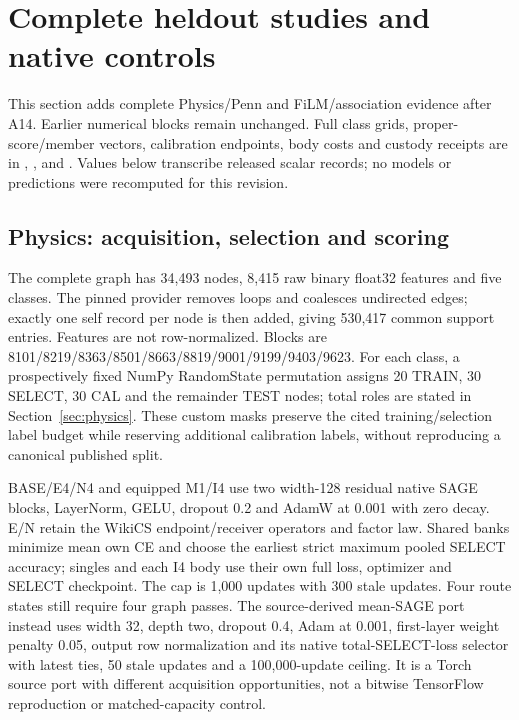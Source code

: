 \section{Complete heldout studies and native controls}\label{app:complete-confirmation-v5}
This section adds complete Physics/Penn and FiLM/association evidence after A14. Earlier numerical blocks remain unchanged. Full class grids, proper-score/member vectors, calibration endpoints, body costs and custody receipts are in , ,  and . Values below transcribe released scalar records; no models or predictions were recomputed for this revision.

\subsection{Physics: acquisition, selection and scoring}\label{app:physics-v5}
The complete graph has 34,493 nodes, 8,415 raw binary float32 features and five classes. The pinned provider removes loops and coalesces undirected edges; exactly one self record per node is then added, giving 530,417 common support entries. Features are not row-normalized. Blocks are 8101/8219/8363/8501/8663/8819/9001/9199/9403/9623. For each class, a prospectively fixed NumPy RandomState permutation assigns 20 TRAIN, 30 SELECT, 30 CAL and the remainder TEST nodes; total roles are stated in Section~\ref{sec:physics}. These custom masks preserve the cited training/selection label budget while reserving additional calibration labels, without reproducing a canonical published split.

BASE/E4/N4 and equipped M1/I4 use two width-128 residual native SAGE blocks, LayerNorm, GELU, dropout 0.2 and AdamW at 0.001 with zero decay. E/N retain the WikiCS endpoint/receiver operators and factor law. Shared banks minimize mean own CE and choose the earliest strict maximum pooled SELECT accuracy; singles and each I4 body use their own full loss, optimizer and SELECT checkpoint. The cap is 1,000 updates with 300 stale updates. Four route states still require four graph passes. The source-derived mean-SAGE port instead uses width 32, depth two, dropout 0.4, Adam at 0.001, first-layer weight penalty 0.05, output row normalization and its native total-SELECT-loss selector with latest ties, 50 stale updates and a 100,000-update ceiling. It is a Torch source port with different acquisition opportunities, not a bitwise TensorFlow reproduction or matched-capacity control.

